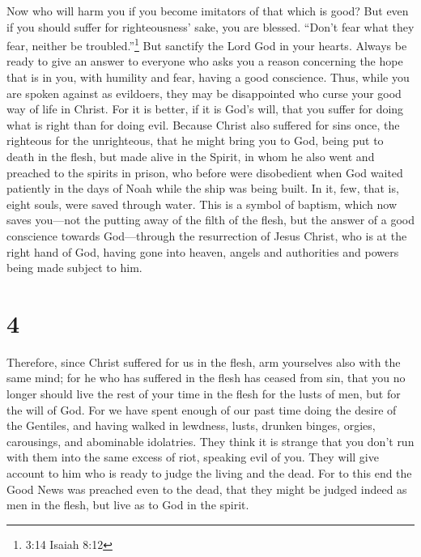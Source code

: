  Now who will harm you if you become imitators of that
which is good?  But even if you should suffer for
righteousness' sake, you are blessed. ``Don't fear what they fear,
neither be troubled.''\footnote{3:14 Isaiah 8:12}  But
sanctify the Lord God in your hearts. Always be ready to give an answer
to everyone who asks you a reason concerning the hope that is in you,
with humility and fear,  having a good conscience. Thus,
while you are spoken against as evildoers, they may be disappointed who
curse your good way of life in Christ.  For it is better,
if it is God's will, that you suffer for doing what is right than for
doing evil.  Because Christ also suffered for sins once,
the righteous for the unrighteous, that he might bring you to God, being
put to death in the flesh, but made alive in the Spirit, 
in whom he also went and preached to the spirits in prison,
 who before were disobedient when God waited patiently in
the days of Noah while the ship was being built. In it, few, that is,
eight souls, were saved through water.  This is a symbol of
baptism, which now saves you---not the putting away of the filth of the
flesh, but the answer of a good conscience towards God---through the
resurrection of Jesus Christ,  who is at the right hand of
God, having gone into heaven, angels and authorities and powers being
made subject to him.

\hypertarget{section-3}{%
\section{4}\label{section-3}}

 Therefore, since Christ suffered for us in the flesh, arm
yourselves also with the same mind; for he who has suffered in the flesh
has ceased from sin,  that you no longer should live the
rest of your time in the flesh for the lusts of men, but for the will of
God.  For we have spent enough of our past time doing the
desire of the Gentiles, and having walked in lewdness, lusts, drunken
binges, orgies, carousings, and abominable idolatries.  They
think it is strange that you don't run with them into the same excess of
riot, speaking evil of you.  They will give account to him
who is ready to judge the living and the dead.  For to this
end the Good News was preached even to the dead, that they might be
judged indeed as men in the flesh, but live as to God in the spirit.

